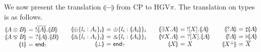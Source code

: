 \documentclass{easychair}
\makeatletter
\newcommand{\ba}{\begin{array}}
\newcommand{\ea}{\end{array}}
\newenvironment{eqs}{\ba{@{}r@{~}c@{~}l@{}}}{\ea}
\newcommand{\key}{\mathsf}
\newcommand{\set}[1]{\{ #1 \}}
\newcommand{\cptogv}[1]{\llparenthesis{#1}\rrparenthesis}
\newcommand{\row}[2]{\set{#1}_{#2}}
\newcommand{\gvOutput}[2]{\mathord{!}{#1}.{#2}}
\newcommand{\gvInput}[2]{\mathord{?}{#1}.{#2}}
\newcommand{\gvEndOutput}{\key{end}_!}
\newcommand{\gvEndInput}{\key{end}_?}
\newcommand{\gvPlus}[2]{\oplus \row{#1}{#2}}
\newcommand{\gvChoice}[2]{\binampersand \row{#1}{#2}}
\newcommand{\gvServer}[1]{\flat {#1}}
\newcommand{\gvService}[1]{\sharp {#1}}
\newcommand{\gvDual}[1]{\overline{#1}}
\newcommand{\gvOutputType}[2]{![{#1}].{#2}}
\newcommand{\gvInputType}[2]{?[{#1}].{#2}}
\newcommand{\la}{l}
\newcommand{\cpTimes}[2]{{#1} \otimes {#2}}
\newcommand{\cpPar}[2]{{#1} \mathbin{\bindnasrepma} {#2}}
\newcommand{\cpPlus}[2]{\oplus \row{#1}{#2}}
\newcommand{\cpWith}[2]{\binampersand \row{#1}{#2}}
\newcommand{\cpOne}{1}
\newcommand{\cpBottom}{\bot}
\newcommand{\cpOfCourse}[1]{\mathord{!}{#1}}
\newcommand{\cpWhyNot}[1]{\mathord{?}{#1}}
\newcommand{\cpDual}[1]{{#1}^\bot}
\newcommand{\cpExists}[2]{\exists {#1}.{#2}}
\newcommand{\cpForall}[2]{\forall {#1}.{#2}}
\newcommand{\hgv}{HGV\xspace}
\newcommand{\hgvpi}{HGV$\pi$\xspace}
\makeatother
\begin{document}
We now present the translation $\cptogv{-}$ from CP to \hgvpi. The translation on types is as
follows.
\[
\ba{@{}c@{\qquad}c@{\qquad}c@{\qquad}c@{}}
\begin{eqs}
\cptogv{\cpTimes{A}{B}} &=& \gvOutput{\gvDual{\cptogv{A}}}{\cptogv{B}} \\
\cptogv{\cpPar{A}{B}}   &=& \gvInput{\cptogv{A}}{\cptogv{B}} \\
\cptogv{\cpOne}         &=& \gvEndOutput \\
\end{eqs}
&
\begin{eqs}
\cptogv{\cpPlus{\la_i:A_i}{i}} &=& \gvPlus{\la_i:\cptogv{A_i}}{i}  \\
\cptogv{\cpWith{\la_i:A_i}{i}} &=& \gvChoice{\la_i:\cptogv{A_i}}{i} \\
\cptogv{\cpBottom}      &=& \gvEndInput \\
\end{eqs}
&
\begin{eqs}
\cptogv{\cpExists{X}{A}} &=& \gvOutputType{X}{\cptogv{A}} \\
\cptogv{\cpForall{X}{A}} &=& \gvInputType{X}{\cptogv{A}} \\
\cptogv{X}               &=& X \\
\end{eqs}
&
\begin{eqs}
\cptogv{\cpWhyNot{A}}    &=& \gvService{\cptogv{A}} \\
\cptogv{\cpOfCourse{A}}  &=& \gvServer{\cptogv{A}} \\
\cptogv{\cpDual{X}}      &=& \gvDual{X} \\
\end{eqs}
\ea
\]
\end{document}
